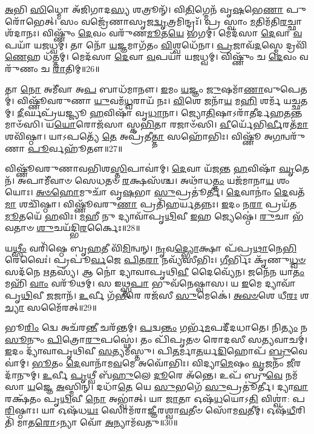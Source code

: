 \-\ul{𑌅}\-𑌭𑌿 \ul{𑌸𑌿}\-𑌧𑍍𑌮𑍋 𑌅᳴𑌜𑌿𑌗𑌾𑌦\-\ul{𑌸𑍍𑌯} 𑌶𑌤𑍍𑌰𑍂𑌨𑍍᳴।
𑌵𑌿\-\ul{𑌤𑌿}\-𑌗𑍍𑌮𑍇𑌨᳴ 𑌵𑍃\-\ul{𑌷}\-𑌭𑍇\-\ul{𑌣𑌾} 𑌪𑍁𑌰𑍋᳴𑌭𑍇𑌤𑍍।
𑌸𑌂 𑌵𑌜𑍍𑌰𑍇᳴𑌣𑌾𑌸𑍃𑌜\-\ul{𑌦𑍍𑌵𑍃}\-𑌤𑍍𑌰𑌮𑌿𑌨𑍍𑌦𑍍𑌰𑌃᳴।
𑌪𑍍𑌰 𑌸𑍍𑌵𑌾𑌂 \ul{𑌮}\-𑌤𑌿𑌮᳴𑌤𑌿\-\ul{𑌰}\-𑌚𑍍𑌛𑌾𑌶᳴𑌦𑌾𑌨𑌃।
𑌵𑌿𑌷𑍍𑌣𑍁𑌂᳴ \ul{𑌦𑍇}\-𑌵𑌂 𑌵𑌰𑍁᳴𑌣\-\ul{𑌮𑍂}\-𑌤\-\ul{𑌯𑍇} 𑌭𑌗𑌮𑍍॑।
𑌮𑍇𑌦᳴𑌸𑌾 \ul{𑌦𑍇}\-𑌵𑌾 \ul{𑌵}\-𑌪𑌯𑌾᳴ 𑌯𑌜𑌧𑍍𑌵𑌮𑍍।
𑌤𑌾 𑌨𑍋᳴ \ul{𑌯}\-𑌜𑍍𑌞𑌮𑌾𑌗᳴𑌤𑌂 \ul{𑌵𑌿}\-𑌶𑍍𑌵𑌧𑍇᳴𑌨𑌾।
\-\ul{𑌪𑍍𑌰}\-𑌜𑌾𑌵᳴\-\ul{𑌦}\-𑌸𑍍𑌮𑍇 𑌦𑍍𑌰𑌵𑌿᳴\-\ul{𑌣𑍇}\-𑌹 𑌧᳴𑌤𑍍𑌤𑌮𑍍।
𑌮𑍇𑌦᳴𑌸𑌾 \ul{𑌦𑍇}\-𑌵𑌾 \ul{𑌵}\-𑌪𑌯𑌾᳴ 𑌯𑌜𑌧𑍍𑌵𑌮𑍍।
𑌵𑌿𑌷𑍍𑌣𑍁𑌂᳴ 𑌚 \ul{𑌦𑍇}\-𑌵𑌂 𑌵𑌰𑍁᳴𑌣𑌂 𑌚 \ul{𑌰𑌾}\-𑌤𑌿𑌮𑍍॥26॥

𑌤𑌾 \ul{𑌨𑍋} 𑌅𑌮𑍀᳴𑌵𑌾 𑌅\-\ul{𑌪} 𑌬𑌾𑌧᳴𑌮𑌾𑌨𑍗।
\-\ul{𑌇}\-𑌮𑌂 \ul{𑌯}\-𑌜𑍍𑌞𑌂 \ul{𑌜𑍁}\-𑌷𑌮𑌾᳴\-\ul{𑌣𑌾}\-𑌵𑍁𑌪𑍇𑌤𑌮𑍍॑।
𑌵𑌿𑌷𑍍𑌣𑍂᳴𑌵𑌰𑍁𑌣𑌾 \ul{𑌯𑍁}\-𑌵𑌮᳴\-\ul{𑌧𑍍𑌵}\-𑌰𑌾𑌯᳴ 𑌨𑌃।
\-\ul{𑌵𑌿}\-𑌶𑍇 𑌜𑌨𑌾᳴\-\ul{𑌯} 𑌮\-\ul{𑌹𑌿} 𑌶𑌰𑍍𑌮᳴ 𑌯𑌚𑍍𑌛𑌤𑌮𑍍।
\-\ul{𑌦𑍀}\-𑌰𑍍𑌘𑌪𑍍𑌰᳴𑌯𑌜𑍍𑌜𑍍𑌯𑍂 \ul{𑌹}\-𑌵𑌿𑌷𑌾᳴ 𑌵𑍃\-\ul{𑌧𑌾}\-𑌨𑌾।
𑌜𑍍𑌯𑍋\-\ul{𑌤𑌿}\-𑌷𑌾\-𑌽𑌰𑌾᳴𑌤𑍀𑌰𑍍𑌦𑌹\-\-\ul{𑌤}\-𑌨𑍍𑌤𑌮𑌾𑍞᳴𑌸𑌿।
𑌯\-\ul{𑌯𑍋}\-𑌰𑍋𑌜᳴𑌸𑌾 𑌸𑍍𑌕\-\ul{𑌭𑌿}\-𑌤𑌾 𑌰𑌜𑌾𑍞᳴𑌸𑌿।
\-\ul{𑌵𑍀}\-𑌰𑍍𑌯𑍇᳴𑌭𑌿\-\ul{𑌰𑍍𑌵𑍀}\-𑌰𑌤᳴\-\ul{𑌮𑌾} 𑌶𑌵𑌿᳴𑌷𑍍𑌠𑌾।
𑌯𑌾𑌽𑌪𑌤𑍍𑌯𑍇᳴ \ul{𑌤𑍇} 𑌅𑌪𑍍𑌰᳴𑌤𑍀\-\ul{𑌤𑍍𑌤𑌾} 𑌸𑌹𑍋᳴𑌭𑌿𑌃।
𑌵𑌿𑌷𑍍𑌣𑍂᳴ 𑌅\-\ul{𑌗}\-𑌨𑍍𑌵𑌰𑍁᳴𑌣𑌾 \ul{𑌪𑍂}\-𑌰𑍍𑌵𑌹𑍂᳴𑌤𑍗॥27॥

𑌵𑌿𑌷𑍍𑌣𑍂᳴𑌵𑌰𑍁𑌣𑌾𑌵𑌭𑌿𑌶\-\ul{𑌸𑍍𑌤𑌿}\-𑌪𑌾𑌵𑌾॑𑌮𑍍।
\-\ul{𑌦𑍇}\-𑌵𑌾 𑌯᳴𑌜𑌨𑍍𑌤 \ul{𑌹}\-𑌵𑌿𑌷𑌾᳴ \ul{𑌘𑍃}\-𑌤𑍇𑌨᳴।
𑌅𑌪𑌾𑌮𑍀᳴𑌵𑌾𑍞 𑌸𑍇𑌧𑌤𑍞 \ul{𑌰}\-𑌕𑍍𑌷𑌸᳴𑌶𑍍𑌚।
𑌅𑌥𑌾᳴𑌧\-\ul{𑌤𑍍𑌤𑌂} 𑌯𑌜᳴𑌮𑌾𑌨𑌾\-\ul{𑌯} 𑌶𑌂 𑌯𑍋𑌃।
\-\ul{𑌅}\-\-\ul{𑍞}\-\-\ul{𑌹𑍋}\-𑌮𑍁𑌚𑌾᳴ 𑌵𑍃\-\ul{𑌷}\-𑌭𑌾 \ul{𑌸𑍁}\-𑌪𑍍𑌰𑌤𑍂॑𑌰𑍍𑌤𑍀।
\-\ul{𑌦𑍇}\-𑌵𑌾𑌨𑌾𑌂॑ \ul{𑌦𑍇}\-𑌵𑌤᳴\-\ul{𑌮𑌾} 𑌶𑌚𑌿᳴𑌷𑍍𑌠𑌾।
𑌵𑌿𑌷𑍍𑌣𑍂᳴𑌵𑌰𑍁\-\ul{𑌣𑌾} 𑌪𑍍𑌰𑌤𑌿᳴\-𑌹𑌰𑍍𑌯𑌤𑌨𑍍𑌨𑌃।
\-\ul{𑌇}\-𑌦𑌂 𑌨\-\ul{𑌰𑌾} 𑌪𑍍𑌰𑌯᳴𑌤\-\ul{𑌮𑍂}\-𑌤𑌯𑍇᳴ \ul{𑌹}\-𑌵𑌿𑌃।
\-\ul{𑌮}\-𑌹𑍀 𑌨𑍁 𑌦𑍍𑌯𑌾𑌵𑌾᳴𑌪𑍃\-\ul{𑌥𑌿}\-𑌵𑍀 \ul{𑌇}\-𑌹 𑌜𑍍𑌯𑍇𑌷𑍍𑌠𑍇॑।
\-\ul{𑌰𑍁}\-𑌚𑌾 𑌭᳴𑌵𑌤𑌾𑍞 \ul{𑌶𑍁}\-𑌚𑌯᳴𑌦𑍍𑌭𑌿\-\ul{𑌰}\-𑌰𑍍𑌕𑍈𑌃॥28॥

𑌯\-\ul{𑌥𑍍𑌸𑍀𑌂} 𑌵𑌰𑌿᳴𑌷𑍍𑌠𑍇 𑌬𑍃\-\ul{𑌹}\-𑌤𑍀 𑌵𑌿᳴\-\ul{𑌮𑌿}\-𑌨𑍍𑌵𑌨𑍍।
\-\ul{𑌨𑍃}\-𑌵\-\ul{𑌦𑍍𑌭𑍍𑌯𑍋}\-𑌕𑍍𑌷𑌾 𑌪᳴𑌪𑍍𑌰\-\ul{𑌥𑌾}\-𑌨𑍇\-\ul{𑌭𑌿}\-𑌰𑍇𑌵𑍈𑌃॑।
𑌪𑍍𑌰𑌪𑍂॑\-\ul{𑌰𑍍𑌵}\-𑌜𑍇 \ul{𑌪𑌿}\-𑌤\-\ul{𑌰𑌾} 𑌨𑌵𑍍𑌯᳴𑌸𑍀𑌭𑌿𑌃।
\-\ul{𑌗𑍀}\-𑌰𑍍𑌭𑌿𑌃 𑌕𑍃᳴𑌣𑍁\-\ul{𑌧𑍍𑌵}\-\-\ul{𑍞} 𑌸𑌦᳴𑌨𑍇 \ul{𑌋}\-𑌤𑌸𑍍𑌯᳴।
𑌆 𑌨𑍋॑ 𑌦𑍍𑌯𑌾𑌵𑌾𑌪𑍃𑌥𑌿\-\ul{𑌵𑍀} 𑌦𑍈𑌵𑍍𑌯𑍇᳴𑌨।
𑌜𑌨𑍇᳴𑌨 𑌯𑌾\-\ul{𑌤𑌂} 𑌮𑌹𑌿᳴ \ul{𑌵𑌾𑌂} 𑌵𑌰𑍂᳴𑌥𑌮𑍍।
𑌸 𑌇𑌥𑍍𑌸𑍍𑌵\-\ul{𑌪𑌾} 𑌭𑍁𑌵᳴𑌨𑍇𑌷𑍍𑌵𑌾𑌸।
𑌯 \ul{𑌇}\-𑌮𑍇 𑌦𑍍𑌯𑌾𑌵𑌾᳴𑌪𑍃\-\ul{𑌥𑌿}\-𑌵𑍀 \ul{𑌜}\-𑌜𑌾𑌨᳴।
\-\ul{𑌉}\-𑌰𑍍𑌵𑍀 𑌗᳴\-\ul{𑌭𑍀}\-𑌰𑍇 𑌰𑌜᳴𑌸𑍀 \ul{𑌸𑍁}\-𑌮𑍇𑌕𑍇॑।
\-\ul{𑌅}\-\-\ul{𑌵}\-\-\ul{𑍞}\-𑌶𑍇 𑌧𑍀\-\ul{𑌰𑌃} 𑌶\-\ul{𑌚𑍍𑌯𑌾} 𑌸𑌮𑍈᳴𑌰𑌤𑍍॥29॥

𑌭𑍂\-\ul{𑌰𑌿𑌂} 𑌦𑍍𑌵𑍇 𑌅𑌚᳴𑌰\-\ul{𑌨𑍍𑌤𑍀} 𑌚𑌰᳴𑌨𑍍𑌤𑌮𑍍।
\-\ul{𑌪}\-𑌦𑍍𑌵\-\ul{𑌨𑍍𑌤𑌂} 𑌗𑌰𑍍𑌭᳴\-\ul{𑌮}\-𑌪𑌦𑍀᳴𑌦𑌧𑌾𑌤𑍇।
𑌨𑌿\-\ul{𑌤𑍍𑌯𑌂} 𑌨 \ul{𑌸𑍂}\-𑌨𑍁𑌂 \ul{𑌪𑌿}\-𑌤𑍍𑌰𑍋\-\ul{𑌰𑍁}\-𑌪𑌸𑍍𑌥𑍇॑।
𑌤𑌂 𑌪𑌿᳴𑌪𑍃𑌤𑍞 𑌰𑍋𑌦𑌸𑍀 𑌸\-\ul{𑌤𑍍𑌯}\-𑌵𑌾𑌚𑌮𑍍॑।
\-\ul{𑌇}\-𑌦𑌂 𑌦𑍍𑌯𑌾᳴𑌵𑌾𑌪𑍃𑌥𑌿𑌵𑍀 \ul{𑌸}\-𑌤𑍍𑌯𑌮᳴𑌸𑍍𑌤𑍁।
𑌪𑌿\-\ul{𑌤}\-𑌰𑍍𑌮𑌾\-\ul{𑌤}\-𑌰𑍍𑌯\-\ul{𑌦𑌿}\-𑌹𑍋𑌪᳴ \ul{𑌬𑍍𑌰𑍁}\-𑌵𑍇 𑌵𑌾॑𑌮𑍍।
\-\ul{𑌭𑍂}\-𑌤𑌂 \ul{𑌦𑍇}\-𑌵𑌾𑌨𑌾᳴𑌮\-\ul{𑌵}\-𑌮𑍇 𑌅𑌵𑍋᳴𑌭𑌿𑌃।
𑌵𑌿𑌦𑍍𑌯𑌾\-\ul{𑌮𑍇}\-𑌷𑌂 \ul{𑌵𑍃}\-𑌜𑌨𑌂᳴ \ul{𑌜𑍀}\-𑌰𑌦𑌾᳴𑌨𑍁𑌮𑍍।
\-\ul{𑌉}\-𑌰𑍍𑌵𑍀 \ul{𑌪𑍃}\-𑌥𑍍𑌵𑍀 𑌬᳴\-\ul{𑌹𑍁}\-𑌲𑍇 \ul{𑌦𑍂}\-𑌰𑍇 𑌅᳴𑌨𑍍𑌤𑍇।
𑌉𑌪᳴ 𑌬𑍍𑌰𑍁\-\ul{𑌵𑍇} 𑌨𑌮᳴𑌸𑌾 \ul{𑌯}\-𑌜𑍍𑌞𑍇 \ul{𑌅}\-𑌸𑍍𑌮𑌿𑌨𑍍।
𑌦𑌧𑌾᳴\-\ul{𑌤𑍇} 𑌯𑍇 \ul{𑌸𑍁}\-𑌭𑌗𑍇᳴ \ul{𑌸𑍁}\-𑌪𑍍𑌰𑌤𑍂॑𑌰𑍍𑌤𑍀।
𑌦𑍍𑌯𑌾\-\ul{𑌵𑌾} 𑌰𑌕𑍍𑌷᳴𑌤𑌂 𑌪𑍃\-\ul{𑌥𑌿}\-𑌵𑍀 \ul{𑌨𑍋} 𑌅𑌭𑍍𑌵𑌾॑𑌤𑍍।
𑌯𑌾 \ul{𑌜𑌾}\-𑌤𑌾 𑌓𑌷᳴\-\ul{𑌧}\-𑌯𑍋𑌽\-\ul{𑌤𑌿} 𑌵𑌿𑌶𑍍𑌵𑌾॑: 𑌪\-\ul{𑌰𑌿}\-𑌷𑍍𑌠𑌾𑌃।
𑌯𑌾 𑌓𑌷᳴𑌧\-\ul{𑌯𑌃} 𑌸𑍋𑌮᳴𑌰𑌾𑌜𑍍𑌞𑍀𑌰𑌶𑍍𑌵𑌾\-\ul{𑌵}\-𑌤𑍀𑍞 𑌸𑍋᳴𑌮\-\ul{𑌵}\-𑌤𑍀𑌮𑍍।
𑌓𑌷᳴\-\ul{𑌧𑍀}\-𑌰𑌿𑌤𑌿᳴ 𑌮𑌾𑌤\-\ul{𑌰𑍋}\-\-𑌽𑌨𑍍𑌯𑌾 𑌵𑍋᳴ \ul{𑌅}\-𑌨𑍍𑌯𑌾𑌮᳴𑌵𑌤𑍁॥30॥\anuvakamend[\-\ul{𑌹}\-𑌵𑌿𑌰𑍍𑌨𑍋᳴ 𑌦𑌾𑌦𑍍𑌭𑌭𑍂𑌵 \ul{𑌰𑌾}\-𑌤𑌿𑌂 \ul{𑌪𑍂}\-𑌰𑍍𑌵𑌹𑍂᳴𑌤𑌾\-\ul{𑌵}\-𑌰𑍍𑌕𑍈𑌰𑍈᳴𑌰\-\ul{𑌦}\-𑌸𑍍𑌮𑌿𑌨𑍍𑌪𑌞𑍍𑌚᳴ 𑌚]

